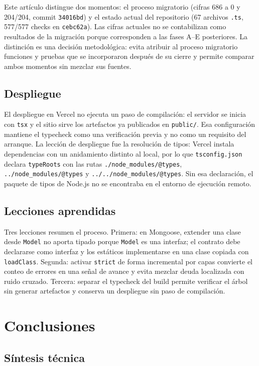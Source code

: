 \documentclass[conference]{IEEEtran}
\begin{document}
Este artículo distingue dos momentos: el proceso migratorio (cifras 686 a 0 y
204/204, commit \texttt{34016bd}) y el estado actual del repositorio (67
archivos \texttt{.ts}, 577/577 checks en \texttt{cebc62a}). Las cifras actuales
no se contabilizan como resultados de la migración porque corresponden a las
fases A--E posteriores. La distinción es una decisión metodológica: evita
atribuir al proceso migratorio funciones y pruebas que se incorporaron después
de su cierre y permite comparar ambos momentos sin mezclar sus fuentes.

\subsection{Despliegue}

El despliegue en Vercel no ejecuta un paso de compilación: el servidor se inicia
con \texttt{tsx} y el sitio sirve los artefactos ya publicados en
\texttt{public/}. Esa configuración mantiene el typecheck como una verificación
previa y no como un requisito del arranque. La lección de despliegue fue la
resolución de tipos: Vercel instala dependencias con un anidamiento distinto al
local, por lo que \texttt{tsconfig.json} declara \texttt{typeRoots} con las rutas
\texttt{./node\_modules/@types}, \texttt{../node\_modules/@types} y
\texttt{../../node\_modules/@types}. Sin esa declaración, el paquete de tipos de
Node.js no se encontraba en el entorno de ejecución remoto.

\subsection{Lecciones aprendidas}

Tres lecciones resumen el proceso. Primera: en Mongoose, extender una clase
desde \texttt{Model} no aporta tipado porque \texttt{Model} es una interfaz; el
contrato debe declararse como interfaz y los estáticos implementarse en una
clase copiada con \texttt{loadClass}. Segunda: activar \texttt{strict} de forma
incremental por capas convierte el conteo de errores en una señal de avance y
evita mezclar deuda localizada con ruido cruzado. Tercera: separar el typecheck
del build permite verificar el árbol sin generar artefactos y conserva un
despliegue sin paso de compilación.

\section{Conclusiones}

\subsection{Síntesis técnica}
\end{document}
